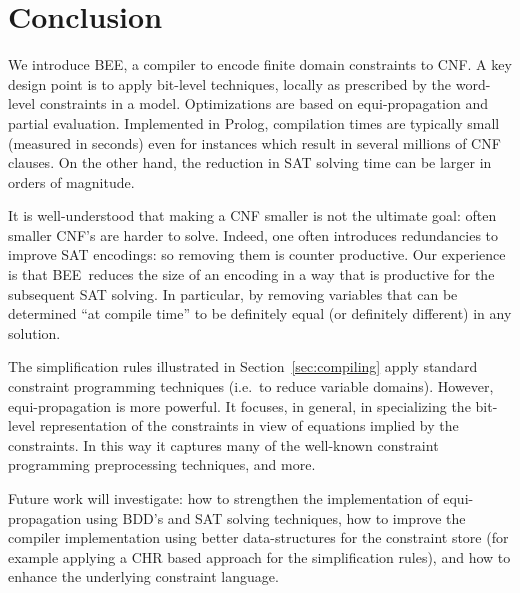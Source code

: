 \documentclass{tlp}
\newcommand{\bee}{\textsf{BEE}}
\begin{document}
\section{Conclusion}

We introduce \bee, a compiler to encode finite domain constraints to
CNF. A key design point is to apply bit-level techniques, locally as
prescribed by the word-level constraints in a model.
Optimizations are based on equi-propagation and partial
evaluation.  Implemented in Prolog, compilation times are
typically small (measured in seconds) even for instances which result
in several millions of CNF clauses.  On the other hand, the reduction
in SAT solving time can be larger in orders of magnitude.

It is well-understood that making a CNF smaller is not the ultimate
goal: often smaller CNF's are harder to solve.  Indeed, one often
introduces redundancies to improve SAT encodings: so removing them is
counter productive.  Our experience is that \bee\ reduces the size of
an encoding in a way that is productive for the subsequent SAT
solving. In particular, by removing variables that can be determined
``at compile time'' to be definitely equal (or definitely different)
in any solution.


The simplification rules illustrated in Section~\ref{sec:compiling}
apply standard constraint programming techniques (i.e.~to reduce
variable domains). However, equi-propagation is more powerful. It
focuses, in general, in specializing the bit-level representation of
the constraints in view of equations implied by the constraints. In
this way it captures many of the well-known constraint programming
preprocessing techniques, and more.



Future work will investigate: how to strengthen the implementation of
equi-propagation using BDD's and SAT solving techniques, how to
improve the compiler implementation using better data-structures for
the constraint store (for example applying a CHR based approach for
the simplification rules), and how to enhance the underlying
constraint language.
\end{document}
